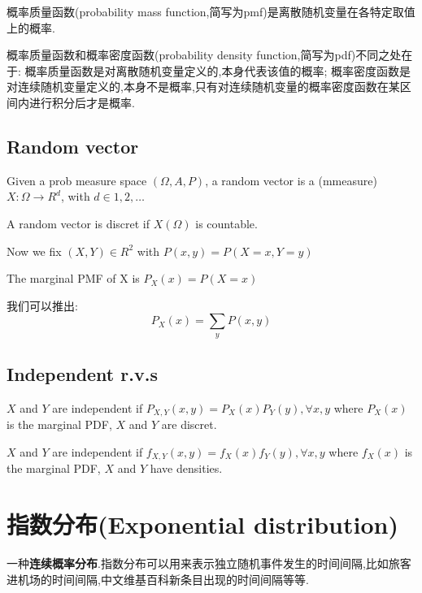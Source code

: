 \documentclass{article}
\begin{document}
概率质量函数(probability mass function,简写为pmf)是离散随机变量在各特定取值上的概率.

概率质量函数和概率密度函数(probability density function,简写为pdf)不同之处在于:
概率质量函数是对离散随机变量定义的,本身代表该值的概率;
概率密度函数是对连续随机变量定义的,本身不是概率,只有对连续随机变量的概率密度函数在某区间内进行积分后才是概率.

\subsection{Random vector}
\begin{definition}
Given a prob measure space $(\Omega, A, P)$, a random vector is a (mmeasure) $X: \Omega \rightarrow R^d$, with $d \in {1, 2, \ldots}$
\end{definition}

\begin{definition}
A random vector is discret if $X(\Omega)$ is countable.
\end{definition}

Now we fix $(X,Y) \in R^2$ with $P(x,y) = P(X=x, Y=y)$
\begin{definition}
The marginal PMF of X is $P_X(x) = P(X = x)$
\end{definition}
我们可以推出: $$P_X(x) = \sum_{y} P(x,y)$$

\subsection{Independent r.v.s}
\begin{definition}
$X$ and $Y$ are independent if $P_{X,Y}(x,y) = P_X(x)P_Y(y), \forall x, y$ where $P_X(x)$ is the marginal PDF, $X$ and $Y$ are discret.
\end{definition}

\begin{definition}
$X$ and $Y$ are independent if $f_{X,Y}(x,y) = f_X(x)f_Y(y), \forall x, y$ where $f_X(x)$ is the marginal PDF, $X$ and $Y$ have densities.
\end{definition}

\section{指数分布(Exponential distribution)}
\label{sec.distribution.exponential}
一种\textbf{连续概率分布}.指数分布可以用来表示独立随机事件发生的时间间隔,比如旅客进机场的时间间隔,中文维基百科新条目出现的时间间隔等等.
\end{document}

